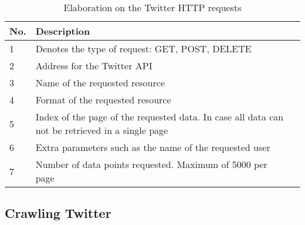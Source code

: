 \begin{table}[H] 
\begin{centering}
\begin{tabular}{|l|p{9cm}|l|}
No.			&	Description 		\\\hline
1			&	Denotes the type of request: GET, POST, DELETE 					\\\hline
2			&	Address for the Twitter API					\\\hline
3			&	Name of the requested resource					\\\hline
4			&	Format of the requested resource					\\\hline
5			&	Index of the page of the requested data. In case all data can not be
retrieved in a single page \\\hline 
6			&	Extra parameters such as the name of the requested user					\\\hline
7			&	Number of data points requested. Maximum of 5000 per page					\\\hline
\end{tabular}
\caption{Elaboration on the Twitter HTTP requests}
\label{httpElaboration}
\end{centering}
\end{table}











\subsection{Crawling Twitter}
